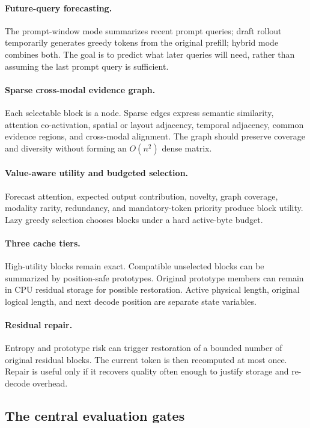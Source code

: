 \documentclass[11pt]{article}
\begin{document}
\paragraph{Future-query forecasting.}
The prompt-window mode summarizes recent prompt queries; draft rollout temporarily generates
greedy tokens from the original prefill; hybrid mode combines both.  The goal is to predict what
later queries will need, rather than assuming the last prompt query is sufficient.

\paragraph{Sparse cross-modal evidence graph.}
Each selectable block is a node.  Sparse edges express semantic similarity, attention
co-activation, spatial or layout adjacency, temporal adjacency, common evidence regions, and
cross-modal alignment.  The graph should preserve coverage and diversity without forming an
$O(n^2)$ dense matrix.

\paragraph{Value-aware utility and budgeted selection.}
Forecast attention, expected output contribution, novelty, graph coverage, modality rarity,
redundancy, and mandatory-token priority produce block utility.  Lazy greedy selection chooses
blocks under a hard active-byte budget.

\paragraph{Three cache tiers.}
High-utility blocks remain exact.  Compatible unselected blocks can be summarized by
position-safe prototypes.  Original prototype members can remain in CPU residual storage for
possible restoration.  Active physical length, original logical length, and next decode position
are separate state variables.

\paragraph{Residual repair.}
Entropy and prototype risk can trigger restoration of a bounded number of original residual
blocks.  The current token is then recomputed at most once.  Repair is useful only if it recovers
quality often enough to justify storage and re-decode overhead.

\subsection{The central evaluation gates}
\end{document}
